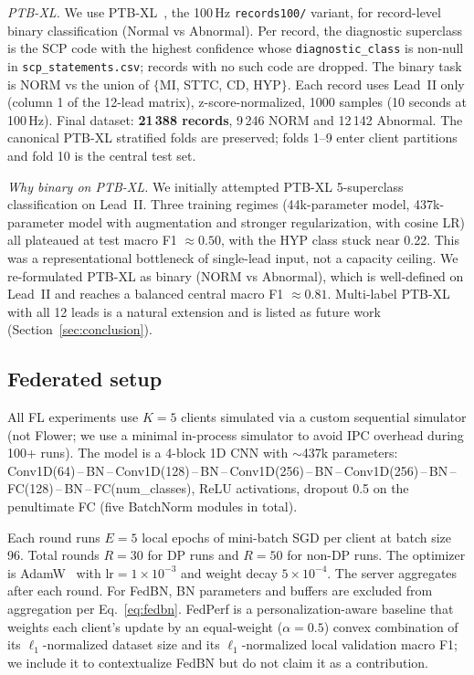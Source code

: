 \documentclass[conference]{IEEEtran}
\newcommand{\code}[1]{\texttt{\small #1}}
\begin{document}
\emph{PTB-XL.} We use PTB-XL~\cite{ptbxl}, the 100\,Hz \code{records100/} variant, for record-level binary classification (Normal vs Abnormal). Per record, the diagnostic superclass is the SCP code with the highest confidence whose \code{diagnostic\_class} is non-null in \code{scp\_statements.csv}; records with no such code are dropped. The binary task is NORM vs the union of $\{$MI, STTC, CD, HYP$\}$. Each record uses Lead~II only (column 1 of the 12-lead matrix), z-score-normalized, 1000 samples (10 seconds at 100\,Hz). Final dataset: \textbf{21\,388 records}, 9\,246 NORM and 12\,142 Abnormal. The canonical PTB-XL stratified folds are preserved; folds 1--9 enter client partitions and fold 10 is the central test set.

\emph{Why binary on PTB-XL.} We initially attempted PTB-XL 5-superclass classification on Lead~II. Three training regimes (44k-parameter model, 437k-parameter model with augmentation and stronger regularization, with cosine LR) all plateaued at test macro F1 $\approx 0.50$, with the HYP class stuck near 0.22. This was a representational bottleneck of single-lead input, not a capacity ceiling. We re-formulated PTB-XL as binary (NORM vs Abnormal), which is well-defined on Lead~II and reaches a balanced central macro F1 $\approx 0.81$. Multi-label PTB-XL with all 12 leads is a natural extension and is listed as future work (Section~\ref{sec:conclusion}).

\subsection{Federated setup}
All FL experiments use $K=5$ clients simulated via a custom sequential simulator (not Flower; we use a minimal in-process simulator to avoid IPC overhead during 100+ runs). The model is a 4-block 1D CNN with $\sim$437k parameters: Conv1D(64)\,--\,BN\,--\,Conv1D(128)\,--\,BN\,--\,Conv1D(256)\,--\,BN\,--\,Conv1D(256)\,--\,BN\,--\,FC(128)\,--\,BN\,--\,FC(num\_classes), ReLU activations, dropout 0.5 on the penultimate FC (five BatchNorm modules in total).

Each round runs $E=5$ local epochs of mini-batch SGD per client at batch size 96. Total rounds $R=30$ for DP runs and $R=50$ for non-DP runs. The optimizer is AdamW~\cite{adamw} with $\text{lr} = 1\times10^{-3}$ and weight decay $5\times10^{-4}$. The server aggregates after each round. For FedBN, BN parameters and buffers are excluded from aggregation per Eq.~\eqref{eq:fedbn}. FedPerf is a personalization-aware baseline that weights each client's update by an equal-weight ($\alpha{=}0.5$) convex combination of its $\ell_1$-normalized dataset size and its $\ell_1$-normalized local validation macro F1; we include it to contextualize FedBN but do not claim it as a contribution.
\end{document}
